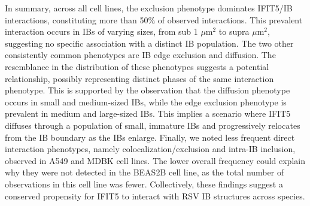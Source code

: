 In summary, across all cell lines, the exclusion phenotype dominates IFIT5/IB interactions, constituting more than 50\% of observed interactions. This prevalent interaction occurs in IBs of varying sizes, from sub 1 \(\mu \mbox{m}^2\) to supra \(\mu \mbox{m}^2\), suggesting no specific association with a distinct IB population. The two other consistently common phenotypes are IB edge exclusion and diffusion. The resemblance in the distribution of these phenotypes suggests a potential relationship, possibly representing distinct phases of the same interaction phenotype. This is supported by the observation that the diffusion phenotype occurs in small and medium-sized IBs, while the edge exclusion phenotype is prevalent in medium and large-sized IBs. This implies a scenario where IFIT5 diffuses through a population of small, immature IBs and progressively relocates from the IB boundary as the IBs enlarge. Finally, we noted less frequent direct interaction phenotypes, namely colocalization/exclusion and intra-IB inclusion, observed in A549 and MDBK cell lines. The lower overall frequency could explain why they were not detected in the BEAS2B cell line, as the total number of observations in this cell line was fewer. Collectively, these findings suggest a conserved propensity for IFIT5 to interact with RSV IB structures across species.

